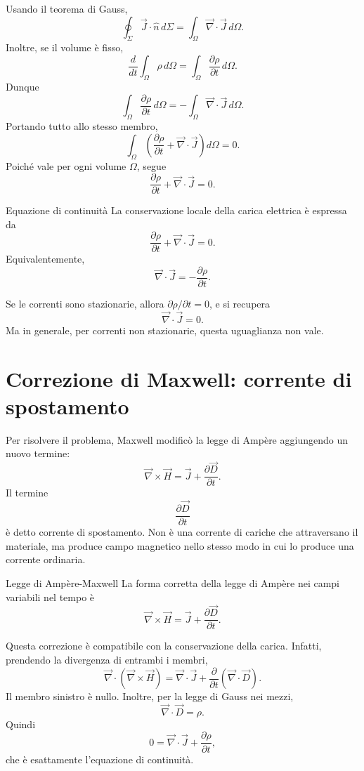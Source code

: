 \documentclass[a4paper]{article}
\begin{document}
Usando il teorema di Gauss,
\[
\oint_\Sigma \vec{J}\cdot\hat{n}\,d\Sigma=
\int_\Omega \vec{\nabla}\cdot\vec{J}\,d\Omega.
\]
Inoltre, se il volume è fisso,
\[
\frac{d}{dt}\int_\Omega \rho\,d\Omega
=\int_\Omega \frac{\partial\rho}{\partial t}\,d\Omega.
\]
Dunque
\[
\int_\Omega \frac{\partial\rho}{\partial t}\,d\Omega
=-\int_\Omega \vec{\nabla}\cdot\vec{J}\,d\Omega.
\]
Portando tutto allo stesso membro,
\[
\int_\Omega \left(\frac{\partial\rho}{\partial t}+\vec{\nabla}\cdot\vec{J}\right)d\Omega=0.
\]
Poiché vale per ogni volume \(\Omega\), segue
\[
\frac{\partial\rho}{\partial t}+\vec{\nabla}\cdot\vec{J}=0.
\]

\begin{snippettheorem}{Equazione di continuità}
La conservazione locale della carica elettrica è espressa da
\[
    \frac{\partial\rho}{\partial t}+\vec{\nabla}\cdot\vec{J}=0.
\]
Equivalentemente,
\[
    \vec{\nabla}\cdot\vec{J}=-\frac{\partial\rho}{\partial t}.
\]
\end{snippettheorem}

Se le correnti sono stazionarie, allora \(\partial\rho/\partial t=0\), e si recupera
\[
\vec{\nabla}\cdot\vec{J}=0.
\]
Ma in generale, per correnti non stazionarie, questa uguaglianza non vale.

\section{Correzione di Maxwell: corrente di spostamento}

Per risolvere il problema, Maxwell modificò la legge di Ampère aggiungendo un nuovo termine:
\[
\vec{\nabla}\times\vec{H}=\vec{J}+\frac{\partial\vec{D}}{\partial t}.
\]
Il termine
\[
\frac{\partial\vec{D}}{\partial t}
\]
è detto corrente di spostamento. Non è una corrente di cariche che attraversano il materiale, ma produce campo magnetico nello stesso modo in cui lo produce una corrente ordinaria.

\begin{snippettheorem}{Legge di Ampère-Maxwell}
La forma corretta della legge di Ampère nei campi variabili nel tempo è
\[
    \vec{\nabla}\times\vec{H}=\vec{J}+\frac{\partial\vec{D}}{\partial t}.
\]
\end{snippettheorem}

Questa correzione è compatibile con la conservazione della carica. Infatti, prendendo la divergenza di entrambi i membri,
\[
\vec{\nabla}\cdot\left(\vec{\nabla}\times\vec{H}\right)
=\vec{\nabla}\cdot\vec{J}+\frac{\partial}{\partial t}\left(\vec{\nabla}\cdot\vec{D}\right).
\]
Il membro sinistro è nullo. Inoltre, per la legge di Gauss nei mezzi,
\[
\vec{\nabla}\cdot\vec{D}=\rho.
\]
Quindi
\[
0=\vec{\nabla}\cdot\vec{J}+\frac{\partial\rho}{\partial t},
\]
che è esattamente l'equazione di continuità.
\end{document}
